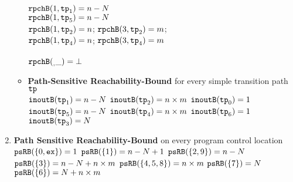 \begin{enumerate}
\begin{itemize}
  \\
  $\mathtt{rpchB}(1, \mathtt{tp}_1) = n - N$ \\
  $\mathtt{rpchB}(1, \mathtt{tp}_5) = n - N$ \\
  $\mathtt{rpchB}(1, \mathtt{tp}_2) = n$; \quad $\mathtt{rpchB}(3, \mathtt{tp}_2) = m$; \\
  $\mathtt{rpchB}(1, \mathtt{tp}_4) = n$; \quad $\mathtt{rpchB}(3, \mathtt{tp}_4) = m$ \\
   \\
  $\mathtt{rpchB}(_, \_) = \bot $ 
  \item \textbf{Path-Sensitive Reachability-Bound} for every simple transition path $\mathtt{tp}$
  \\
  $\mathtt{inoutB}(\mathtt{tp}_1) = n - N$ \quad
  $\mathtt{inoutB}(\mathtt{tp}_2) = n \times m$ \quad
  $\mathtt{inoutB}(\mathtt{tp}_0) = 1$ 
  \\
  $\mathtt{inoutB}(\mathtt{tp}_5) = n - N$ \quad
  $\mathtt{inoutB}(\mathtt{tp}_4) = n \times m$ \quad
  $\mathtt{inoutB}(\mathtt{tp}_6) = 1$ 
  \\
  $\mathtt{inoutB}(\mathtt{tp}_3) = N$ \quad
\end{itemize}
\item \textbf{Path Sensitive Reachability-Bound} on every program control location
\\
$\mathtt{psRB}(\{0, \mathtt{ex}\}) = 1$ \quad
$\mathtt{psRB}(\{1\}) = n - N + 1$ \quad
$\mathtt{psRB}(\{2, 9\}) = n - N$ \quad
$\mathtt{psRB}(\{3\}) = n - N + n \times m$ \quad
$\mathtt{psRB}(\{4, 5, 8\}) = n \times m$ \quad
$\mathtt{psRB}(\{7\}) = N$ \quad
$\mathtt{psRB}(\{6\}) = N + n \times m$ 
\end{enumerate}